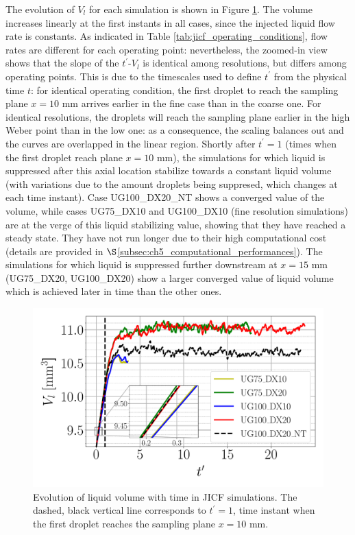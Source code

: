 The evolution of $V_l$ for each simulation is shown in 
Figure \ref{fig:JICF_liquid_volume_increase}. The volume increases linearly at the first instants in all cases, since the injected liquid flow rate is constants. As indicated in Table \ref{tab:jicf_operating_conditions}, flow rates are different for each operating point: nevertheless, the zoomed-in view shows that the slope of the $t^{\prime}$-$V_l$ is identical among resolutions, but differs among operating points. This is due to the timescales used to define $t^{\prime}$ from the physical time $t$: for identical operating condition, the first droplet to reach the sampling plane $x = 10$ mm arrives earlier in the fine case than in the coarse one. For identical resolutions, the droplets will reach the sampling plane earlier in the high Weber point than in the low one: as a consequence, the scaling balances out and the curves are overlapped in the linear region. Shortly after $t^{\prime} = 1$ (times when the first droplet reach plane $x = 10$ mm), the simulations for which liquid is suppressed after this axial location stabilize towards a constant liquid volume (with variations due to the amount droplets being suppresed, which changes at each time instant). Case UG100\_DX20\_NT shows a converged value of the volume, while cases UG75\_DX10 and UG100\_DX10 (fine resolution simulations) are at the verge of this liquid stabilizing value, showing that they have reached a steady state. They have not run longer due to their high computational cost (details are provided in $\S$\ref{subsec:ch5_computational_performances}). The simulations for which liquid is suppressed further downstream at $x = 15$ mm (UG75\_DX20, UG100\_DX20) show a larger converged value of liquid volume which is achieved later in time than the other ones.


\begin{figure}[ht]
\centering
	\centering
   \includegraphics[scale=0.3]{./part2_developments/figures_ch5_resolved_JICF/JICF_liquid_volume_increase}
   \vspace*{-0.15in}
   \caption[Evolution of liquid volume with time in JICF simulations.]{Evolution of liquid volume with time in JICF simulations. The dashed, black vertical line corresponds to $t^\prime = 1$, time instant when the first droplet reaches the sampling plane $x = 10$ mm.}
\label{fig:JICF_liquid_volume_increase}
\end{figure}

